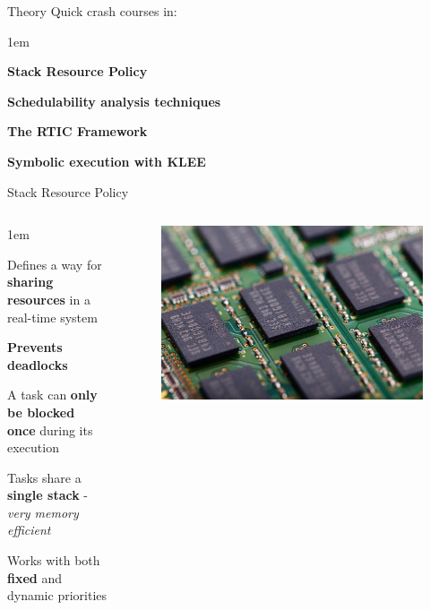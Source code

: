 \begin{frame}{Theory}
    Quick crash courses in:
    \vspace{1em}
    \begin{itemize-size}{1em}
        \item \textbf{Stack Resource Policy}
        \item \textbf{Schedulability analysis techniques}
        \item \textbf{The RTIC Framework}
        \item \textbf{Symbolic execution with KLEE}
    \end{itemize-size}
\end{frame}

\begin{frame}{Stack Resource Policy}
    \begin{columns}
        \begin{itemize-size}{1em}
            \item Defines a way for \textbf{sharing resources} in a real-time system
            \item \textbf{Prevents deadlocks}
            \item A task can \textbf{only be blocked once} during its execution
            \item Tasks share a \textbf{single stack} - \emph{very memory efficient}
            \item Works with both \textbf{fixed} and dynamic priorities
        \end{itemize-size}

        \begin{figure}
            \centering
            \includegraphics[scale=0.15]{pictures/ram.jpg}
        \end{figure}
    \end{columns}
\end{frame}


